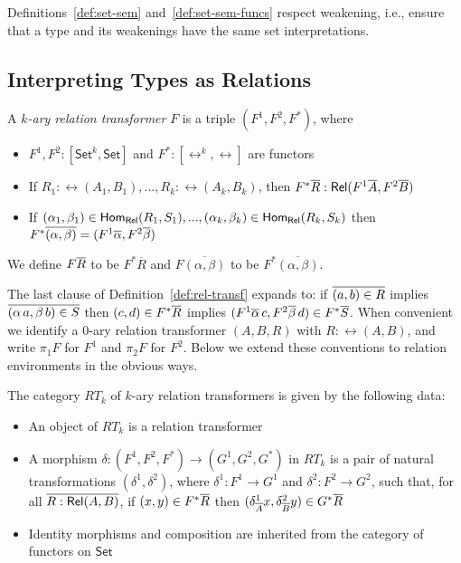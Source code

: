 \documentclass{lmcs}
\theoremstyle{plain}\newtheorem{satz}[thm]{Satz}
\newcommand{\set}{\mathsf{Set}}
\begin{document}
{Definitions~\ref{def:set-sem} and~\ref{def:set-sem-funcs} respect
weakening, i.e., ensure that a type and its weakenings have the same
set interpretations.

\subsection{Interpreting Types as Relations}\label{sec:rel-interp}

\begin{defi}\label{def:rel-transf}
A {\em $k$-ary relation transformer} $F$ is a triple $(F^1, F^2,F^*)$,
where
\begin{itemize}
\item $F^1,F^2 : [\set^k,\set]$ and $F^* : [\rel^k, \rel]$ are
  functors
\item If $R_1:\rel(A_1,B_1),...,R_k:\rel(A_k,B_k)$, then $F^* \overline{R} :
  \mathsf{Rel}(F^1 \overline{A}, F^2 \overline{B})$
\item If $(\alpha_1, \beta_1) \in \mathsf{Hom_{Rel}}(R_1,S_1),..., (\alpha_k,
  \beta_k) \in \mathsf{Hom_{Rel}}(R_k,S_k)$ then $F^* \overline{(\alpha, \beta)} = (F^1
  \overline{\alpha}, F^2 \overline{\beta})$
\end{itemize}
We define $F\overline{R}$ to be $F^*\overline{R}$ and
$F\overline{(\alpha,\beta)}$ to be $F^*\overline{(\alpha,\beta)}$.
\end{defi}
The last clause of Definition~\ref{def:rel-transf} expands to: if
$\overline{(a,b) \in R}$ implies $\overline{(\alpha\,a,\beta\,b) \in S}$ then
$(c,d) \in F^*\overline{R}$ implies $(F^1 \overline{\alpha}\,c,F^2 \overline{\beta}\,d)
\in F^*\overline{S}$. When convenient we identify a $0$-ary relation
transformer $(A,B,R)$ with $R : \rel(A,B)$, and write $\pi_1 F$ for
$F^1$ and $\pi_2 F$ for $F^2$. Below we extend these conventions to
relation environments in the obvious ways.

\begin{defi}
The category $RT_k$ of $k$-ary relation transformers is given by the
following data:
\begin{itemize}
\item An object of $RT_k$ is a relation transformer
\item A morphism $\delta : (F^1,F^2,F^*) \to (G^1,G^2,G^*)$ in $RT_k$
  is a pair of natural transformations $(\delta^1, \delta^2)$, where
  $\delta^1 : F^1 \to G^1$ and $\delta^2 : F^2 \to G^2$, such that,
  for all $\overline{R : \mathsf{Rel}(A, B)}$, if $(x, y) \in F^*\overline{R}$ then
  $(\delta^1_{\overline{A}}x, \delta^2_{\overline{B}}y) \in G^*\overline{R}$
\item Identity morphisms and composition are inherited from the
  category of functors on $\set$
\end{itemize}
\end{defi}

}
\end{document}
